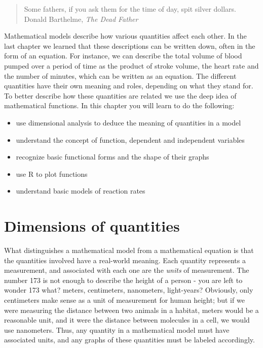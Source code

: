 \documentclass[
]{book}
\providecommand{\tightlist}{%
  \setlength{\itemsep}{0pt}\setlength{\parskip}{0pt}}
\theoremstyle{definition}
\theoremstyle{definition}
\theoremstyle{definition}
\theoremstyle{remark}
\begin{document}
\begin{quote}
Some fathers, if you ask them for the time of day, spit silver dollars.\\
Donald Barthelme, \emph{The Dead Father}
\end{quote}

Mathematical models describe how various quantities affect each other. In the last chapter we learned that these descriptions can be written down, often in the form of an equation. For instance, we can describe the total volume of blood pumped over a period of time as the product of stroke volume, the heart rate and the number of minutes, which can be written as an equation. The different quantities have their own meaning and roles, depending on what they stand for. To better describe how these quantities are related we use the deep idea of mathematical functions. In this chapter you will learn to do the following:

\begin{itemize}
\tightlist
\item
  use dimensional analysis to deduce the meaning of quantities in a model
\item
  understand the concept of function, dependent and independent variables
\item
  recognize basic functional forms and the shape of their graphs
\item
  use R to plot functions
\item
  understand basic models of reaction rates
\end{itemize}

\hypertarget{sec:model2}{%
\section{Dimensions of quantities}\label{sec:model2}}

What distinguishes a mathematical model from a mathematical equation is that the quantities involved have a real-world meaning. Each quantity represents a measurement, and associated with each one are the  \emph{units} of measurement. The number 173 is not enough to describe the height of a person - you are left to wonder 173 what? meters, centimeters, nanometers, light-years? Obviously, only centimeters make sense as a unit of measurement for human height; but if we were measuring the distance between two animals in a habitat, meters would be a reasonable unit, and it were the distance between molecules in a cell, we would use nanometers. Thus, any quantity in a mathematical model must have associated units, and any graphs of these quantities must be labeled accordingly.
\end{document}
